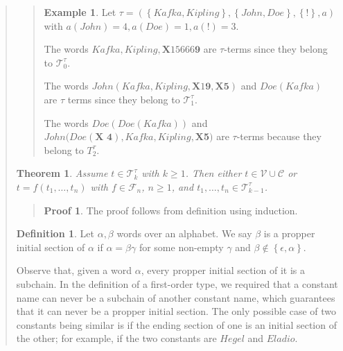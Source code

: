 \documentclass[a4paper, 12pt]{article}
\newtheorem{theorem}{Theorem}
\theoremstyle{definition}
\theoremstyle{definition}
\newtheorem{example}{Example}
\theoremstyle{definition}
\newtheorem{definition}{Definition}
\newtheorem{pro}{Proof}
\begin{document}
\begin{quote}
\begin{quote}
\begin{example}
    Let $\tau = \left( \left\{ Kafka, Kipling \right\}, \left\{ John, Doe \right\}, \left\{ ! \right\}, a    \right) $
    with $a(John) = 4, a(Doe) = 1, a(!) = 3$.

    The words $Kafka, Kipling, \textbf{X}\textit{15666}\textbf{9}$ are $\tau$-terms since 
    they belong to $\mathcal{T}_0^{\tau}$.

    The words $John(Kafka, Kipling, \textbf{X}\textit{1}\textbf{9},
    \textbf{X5})$ and $Doe(Kafka)$ are $\tau$ terms since they belong to
    $\mathcal{T}_1^{\tau}$.

    The words $Doe \left( Doe \left( Kafka \right)  \right) $ and $John (
    Doe(\textbf{X 4}), Kafka, Kipling, $\textbf{X5}$) $ are $\tau$-terms
    because they belong to $T_2^{\tau}$.
\end{example}

\end{quote}
\normalsize


\begin{theorem}
    Assume $t \in \mathcal{T}_k^\tau$ with $k\geq 1$. Then either 
    $t \in \mathcal{V} \cup \mathcal{C}$ or 
    $t = f(t_1, \ldots, t_n)$ with $f \in \mathcal{F}_n$, $n \geq 1$,
    and $t_1,\ldots, t_n \in \mathcal{T}_{k-1}^\tau$.
\end{theorem}


\small
\begin{quote}

\begin{pro}
    The proof follows from definition using induction.
\end{pro}

\end{quote}
\normalsize

\begin{definition}
    Let $\alpha, \beta$ words over an alphabet. We say $\beta$ is a propper initial section
    of $\alpha$ if $\alpha = \beta \gamma$ for some non-empty $\gamma$ and 
    $\beta \not\in \left\{ \epsilon, \alpha \right\} $.
\end{definition}

Observe that, given a word $\alpha$, every propper initial section of it is a
subchain. In the definition of a first-order type, we required that a constant
name can never be a subchain of another constant name, which guarantees that it
can never be a propper initial section. The only possible case of two constants
being similar is if the ending section of one is an initial section of the
other; for example, if the two constants are $Hegel$ and $Eladio$.


\end{quote}
\end{document}

